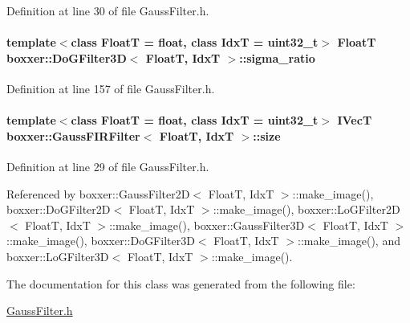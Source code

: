 Definition at line 30 of file Gauss\+Filter.\+h.

\paragraph[{\texorpdfstring{sigma\+\_\+ratio}{sigma_ratio}}]{\setlength{\rightskip}{0pt plus 5cm}template$<$class FloatT  = float, class IdxT  = uint32\+\_\+t$>$ FloatT {\bf boxxer\+::\+Do\+G\+Filter3D}$<$ FloatT, IdxT $>$\+::sigma\+\_\+ratio}\hypertarget{classboxxer_1_1DoGFilter3D_a91ccdf9024dd9db86ba4fc9a9651b305}{}\label{classboxxer_1_1DoGFilter3D_a91ccdf9024dd9db86ba4fc9a9651b305}


Definition at line 157 of file Gauss\+Filter.\+h.

\paragraph[{\texorpdfstring{size}{size}}]{\setlength{\rightskip}{0pt plus 5cm}template$<$class FloatT = float, class IdxT = uint32\+\_\+t$>$ {\bf I\+VecT} {\bf boxxer\+::\+Gauss\+F\+I\+R\+Filter}$<$ FloatT, IdxT $>$\+::size\hspace{0.3cm}{\ttfamily [inherited]}}\hypertarget{classboxxer_1_1GaussFIRFilter_ac0d4e19bb2be3e8913e77283e7e4317e}{}\label{classboxxer_1_1GaussFIRFilter_ac0d4e19bb2be3e8913e77283e7e4317e}


Definition at line 29 of file Gauss\+Filter.\+h.



Referenced by boxxer\+::\+Gauss\+Filter2\+D$<$ Float\+T, Idx\+T $>$\+::make\+\_\+image(), boxxer\+::\+Do\+G\+Filter2\+D$<$ Float\+T, Idx\+T $>$\+::make\+\_\+image(), boxxer\+::\+Lo\+G\+Filter2\+D$<$ Float\+T, Idx\+T $>$\+::make\+\_\+image(), boxxer\+::\+Gauss\+Filter3\+D$<$ Float\+T, Idx\+T $>$\+::make\+\_\+image(), boxxer\+::\+Do\+G\+Filter3\+D$<$ Float\+T, Idx\+T $>$\+::make\+\_\+image(), and boxxer\+::\+Lo\+G\+Filter3\+D$<$ Float\+T, Idx\+T $>$\+::make\+\_\+image().



The documentation for this class was generated from the following file\+:\begin{DoxyCompactItemize}
\item 
\hyperlink{GaussFilter_8h}{Gauss\+Filter.\+h}\end{DoxyCompactItemize}
